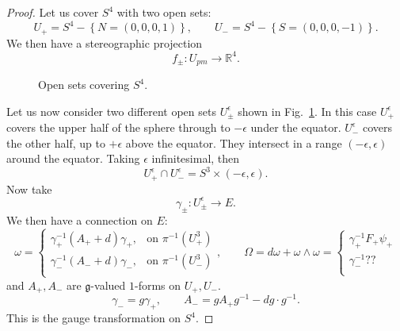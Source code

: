 \begin{proof}
  Let us cover $S^4$ with two open sets:
  \begin{equation}
    U_+ = S^4 - \left\{N = (0,0,0,1)\right\}, \qquad
    U_- = S^4 - \left\{S = (0,0,0,-1)\right\}.
  \end{equation}
  We then have a stereographic projection
  \begin{equation}
    f_{\pm} \colon U_{pm} \to \mathbb{R}^4.
  \end{equation}
  \begin{figure}[tbhp]
    \centering
    \caption{Open sets covering $S^4$.}
    \label{fig:l16f1}
  \end{figure}
  Let us now consider two different open sets $U_{\pm}^{\epsilon}$ shown in Fig.~\ref{fig:l16f1}.
  In this case $U_+^\epsilon$ covers the upper half of the sphere through to $-\epsilon$ under the equator. $U_-^\epsilon$ covers the other half, up to $+\epsilon$ above the equator.
  They intersect in a range $(-\epsilon, \epsilon)$ around the equator.
  Taking $\epsilon$ infinitesimal, then 
  \begin{equation}
    U_+^{\epsilon} \cap U_-^{\epsilon} = S^3 \times (-\epsilon, \epsilon).
  \end{equation}
  Now take 
  \begin{equation}
    \gamma_{\pm} \colon U_{\pm}^{\epsilon} \to E.
  \end{equation}
  We then have a connection on $E$:
  \begin{equation}
    \omega = 
    \begin{cases}
      \gamma_+^{-1} (A_+ + d) \gamma_+, & \text{on } \pi^{-1}(U_+^3)  \\
      \gamma_-^{-1} (A_- + d) \gamma_-, & \text{on } \pi^{-1}(U_-^3)  \\
    \end{cases}, \qquad
    \Omega = d \omega + \omega \wedge \omega = \left\{
      \begin{matrix}
        \gamma_+^{-1} F_+ \psi_+ \\
        \gamma_-^{-1} ??\\
      \end{matrix}
    \right.
  \end{equation}
  and $A_+, A_-$ are $\mathfrak{g}$-valued $1$-forms on $U_+, U_-$.
  \begin{equation}
    \gamma_- = g \gamma_+, \qquad A_- = g A_+ g^{-1} - d g \cdot g^{-1}.
  \end{equation}
  This is the gauge transformation on $S^4$.

\end{proof}
